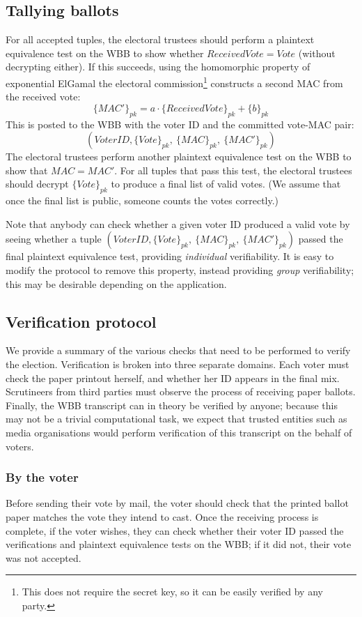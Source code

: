 \documentclass[11pt,twoside,a4paper]{article}
\theoremstyle{definition}
\begin{document}
\subsection{Tallying ballots}
For all accepted tuples, the electoral trustees should perform a plaintext equivalence test on the WBB to show whether \(ReceivedVote=Vote\) (without decrypting either). If this succeeds, using the homomorphic property of exponential ElGamal the electoral commission\footnote{This does not require the secret key, so it can be easily verified by any party.} constructs a second MAC from the received vote:
\[\{MAC'\}_{pk}=a\cdot\{ReceivedVote\}_{pk}+\{b\}_{pk}\]
This is posted to the WBB with the voter ID and the committed vote-MAC pair:
\[\left(VoterID, \{Vote\}_{pk},\ \{MAC\}_{pk},\ \{MAC'\}_{pk}\right)\]
The electoral trustees perform another plaintext equivalence test on the WBB to show that \(MAC=MAC'\). For all tuples that pass this test, the electoral trustees should decrypt \(\{Vote\}_{pk}\) to produce a final list of valid votes. (We assume that once the final list is public, someone counts the votes correctly.)

Note that anybody can check whether a given voter ID produced a valid vote by seeing whether a tuple \(\left(VoterID, \{Vote\}_{pk},\ \{MAC\}_{pk},\ \{MAC'\}_{pk}\right)\) passed the final plaintext equivalence test, providing \textit{individual} verifiability. It is easy to modify the protocol to remove this property, instead providing \textit{group} verifiability; this may be desirable depending on the application.
\subsection{Verification protocol}
We provide a summary of the various checks that need to be performed to verify the election. Verification is broken into three separate domains. Each voter must check the paper printout herself, and whether her ID appears in the final mix. Scrutineers from third parties must observe the process of receiving paper ballots. Finally, the WBB transcript can in theory be verified by anyone; because this may not be a trivial computational task, we expect that trusted entities such as media organisations would perform verification of this transcript on the behalf of voters.

\subsubsection{By the voter}
Before sending their vote by mail, the voter should check that the printed ballot paper matches the vote they intend to cast. Once the receiving process is complete, if the voter wishes, they can check whether their voter ID passed the verifications and plaintext equivalence tests on the WBB; if it did not, their vote was not accepted.
\end{document}
